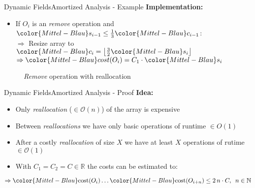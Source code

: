 \begin{frame}{Dynamic Fields}{Amortized Analysis - Example}
  \textbf{Implementation:}
  \begin{itemize}
    \item
    If {\color{Mittel-Blau}$O_i$} is an \textit{remove} operation and
    ${\color{Mittel-Blau}s_{i-1}}
      \leq \frac{1}{3} {\color{Mittel-Blau}c_{i-1}}$:\\
    $\Rightarrow$ Resize array to
    ${\color{Mittel-Blau}c_i}
      = \left\lfloor\frac{3}{2} {\color{Mittel-Blau}s_i} \right\rfloor$\\
    $\Rightarrow {\color{Mittel-Blau}cost(O_i)}
      = C_1 \cdot {\color{Mittel-Blau}s_i}$
  \end{itemize}
  \begin{figure}[!h]
    \def\FSAsize{12}\def\FSAelements{4}%
    \def\FSAcopy{0}\def\FSAdelete{0}\def\FSAinsert{0}%
    \def\FSAcopyarrow{0}%
    \def\FSAlabelsize{${\color{Mittel-Blau}s_{i-1}} = 4$}%
    \def\FSAlabelcapacity{%
      ${\color{Mittel-Blau}c_{i-1}} = 12%
      \geq {\color{Mittel-Blau}s_{i-1}}$}%
    \hspace*{0.5em}\raisebox{2em}{$\Rightarrow$}\hspace*{0.5em}%
    \def\FSAsize{4}\def\FSAelements{0}%
    \def\FSAcopy{3}\def\FSAdelete{1}\def\FSAinsert{0}%
    \def\FSAlabelsize{${\color{Mittel-Blau}s_i}
      = {\color{Mittel-Blau}s_{i-1}} - 1$}%
    \def\FSAlabelcapacity{${\color{Mittel-Blau}c_i}
      = \frac{3}{2}{\color{Mittel-Blau}s_i}$ = 4}%
    \caption{\textit{Remove} operation with reallocation}
    \label{fig:dynamic_fields:amortized_analysis:remove}
  \end{figure}
\end{frame}


\begin{frame}{Dynamic Fields}{Amortized Analysis - Proof}
  \textbf{Idea:}
  \begin{itemize}
    \item
      Only \textit{reallocation} ($\in \mathcal{O}(n)$) of the array is
      expensive
    \item
      Between \textit{reallocations} we have only basic operations of runtime 
      $\in O(1)$
    \item
      After a costly \textit{reallocation} of size $X$ we have at least $X$
      operations of rutime $\in \mathcal{O}(1)$
    \item
      With $C_1 = C_2 = C \in \mathbb{R}$ the costs can be estimated to:
  \end{itemize}
  \[\Rightarrow {\color{Mittel-Blau}\mathrm{cost}(O_i)} \dots
    {\color{Mittel-Blau}\mathrm{cost}(O_{i + n})} \leq 2 \, n \cdot C,
    \hspace*{0.5em}n \in \mathbb{N}\]
\end{frame}

